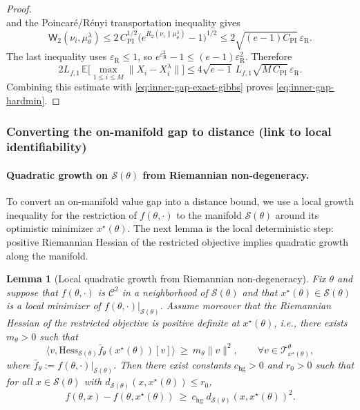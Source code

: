 \documentclass{article}
\theoremstyle{normaltheorem}
\newtheorem{lemma}[lemma]{Lemma}
\newcommand{\gibbs}{\mu}
\newcommand{\calS}{\mathcal{S}}
\newcommand{\calT}{\mathcal{T}}
\begin{document}
\begin{proof}
\[	\]
	and the Poincar\'e/R\'enyi transportation inequality \citep{liu2020poincare} gives
	\[
	\mathsf W_2(\nu_i,\gibbs_\theta^\lambda)
	\le
	2\,C_{\mathrm{PI}}^{1/2}\big(e^{R_2(\nu_i\|\gibbs_\theta^\lambda)}-1\big)^{1/2}
	\le
	2\sqrt{(e-1)C_{\mathrm{PI}}}\,\varepsilon_{\mathrm R}.
	\]
	The last inequality uses \(\varepsilon_{\mathrm R}\le1\), so
	\(e^{\varepsilon_{\mathrm R}^2}-1\le (e-1)\varepsilon_{\mathrm R}^2\).
	Therefore
	\[
	2L_{f,1}\,
	\mathbb E\Big[\max_{1\le i\le M}\|X_i-X_i^\lambda\|\Big]
	\le
	4\sqrt{e-1}\,L_{f,1}\sqrt{M\,C_{\mathrm{PI}}}\,\varepsilon_{\mathrm R}.
	\]
	Combining this estimate with \eqref{eq:inner-gap-exact-gibbs} proves \eqref{eq:inner-gap-hardmin}.
\end{proof}

\subsubsection{Converting the on-manifold gap to distance (link to local identifiability)}

\paragraph{Quadratic growth on $\calS(\theta)$ from Riemannian non-degeneracy.}
To convert an on-manifold value gap into a distance bound, we use a local growth inequality for the restriction of
$f(\theta,\cdot)$ to the manifold $\calS(\theta)$ around its optimistic minimizer $x^\star(\theta)$.
The next lemma is the local deterministic step: positive Riemannian Hessian of the restricted objective implies
quadratic growth along the manifold.

\begin{lemma}[Local quadratic growth from Riemannian non-degeneracy]\label{lem:hg-from-nondeg}
Fix $\theta$ and suppose that $f(\theta,\cdot)$ is $\mathcal{C}^{2}$ in a neighborhood of $\calS(\theta)$ and that
$x^\star(\theta)\in\calS(\theta)$ is a local minimizer of \(f(\theta,\cdot)|_{\calS(\theta)}\).
Assume moreover that the Riemannian Hessian of the restricted objective is positive definite at \(x^\star(\theta)\), i.e.,
there exists \(m_\theta>0\) such that
\[
\big\langle v,\mathrm{Hess}_{\calS(\theta)}\bar f_\theta(x^\star(\theta))[v]\big\rangle
\ \ge\
m_\theta\|v\|^2,
\qquad
\forall v\in\calT_{x^\star(\theta)}^\theta,
\]
where \(\bar f_\theta:=f(\theta,\cdot)|_{\calS(\theta)}\).
Then there exist constants $c_{\mathrm{hg}}>0$ and $r_0>0$ such that for all $x\in\calS(\theta)$ with
$d_{\calS(\theta)}(x,x^\star(\theta))\le r_0$,
\begin{equation}\label{eq:quadratic-growth-onS}
f(\theta,x)-f(\theta,x^\star(\theta))
\ \ge\
c_{\mathrm{hg}}\; d_{\calS(\theta)}(x,x^\star(\theta))^2.
\end{equation}
\end{lemma}
\end{document}
